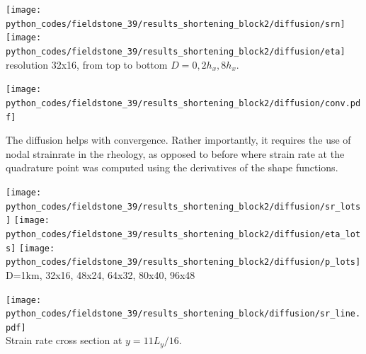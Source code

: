 \begin{center}
\texttt{[image: python\_codes/fieldstone\_39/results\_shortening\_block2/diffusion/srn]}
\texttt{[image: python\_codes/fieldstone\_39/results\_shortening\_block2/diffusion/eta]}\\
{\captionfont resolution 32x16, from top to bottom $D=0,2h_x,8h_x$.}
\end{center}

\begin{center}
\texttt{[image: python\_codes/fieldstone\_39/results\_shortening\_block2/diffusion/conv.pdf]}
\end{center}

The diffusion helps with convergence. Rather importantly, it requires the use of nodal strainrate 
in the rheology, as opposed to before where strain rate at the quadrature point was computed using 
the derivatives of the shape functions. 


\begin{center}
\texttt{[image: python\_codes/fieldstone\_39/results\_shortening\_block2/diffusion/sr\_lots]}
\texttt{[image: python\_codes/fieldstone\_39/results\_shortening\_block2/diffusion/eta\_lots]}
\texttt{[image: python\_codes/fieldstone\_39/results\_shortening\_block2/diffusion/p\_lots]}\\
{\captionfont D=1km, 32x16, 48x24, 64x32, 80x40, 96x48}
\end{center}

\begin{center}
\texttt{[image: python\_codes/fieldstone\_39/results\_shortening\_block/diffusion/sr\_line.pdf]}\\
{\captionfont Strain rate cross section at $y=11L_y/16$.}
\end{center}


